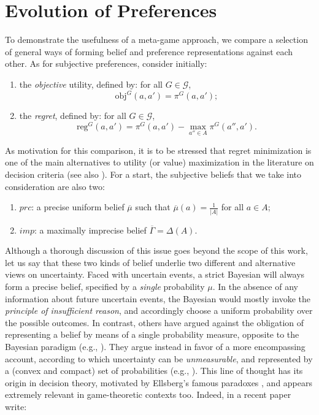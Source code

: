 \documentclass[fleqn,reqno,12pt]{article}
\theoremstyle{Satz}
\theoremstyle{Bsp}
\begin{document}
\section{Evolution of Preferences} \label{sec:model}

To demonstrate the usefulness of a meta-game approach, we compare a
selection of general ways of forming belief and preference representations against each
other. As for subjective preferences, consider initially:
\begin{enumerate}
\item the \textit{objective} utility, defined by: for all $G \in \mathcal{G}$,
$$\text{obj}^G(a,a')=\pi^G(a,a');$$
\item the \textit{regret}, defined by: for all $G \in \mathcal{G}$,
$$\text{reg}^G(a,a') =\pi^G(a,a')- \max_{a''\in A} \pi^G(a'',a').$$
\end{enumerate}

As motivation for this comparison, it is to be stressed that regret minimization is one of the main alternatives to utility (or value) maximization in the literature on decision criteria (see also \cite{bleWakker15}).
For a start, the subjective beliefs that we take into consideration are also two:
\begin{enumerate}
\item $prc$: a precise uniform belief $\overline{\mu}$ such that $\overline{\mu}(a)=\frac{1}{|A|}$ for all $a\in A$;
\item $imp$: a maximally imprecise belief $\overline{\Gamma}=\Delta(A)$.
\end{enumerate}

Although a thorough discussion of this issue goes beyond the scope of this work, let us say
that these two kinds of belief underlie two different and alternative views on
uncertainty. Faced with uncertain events, a strict Bayesian will always form a precise belief,
specified by a \textit{single} probability $\mu$. In the absence of any information about
future uncertain events, the Bayesian would mostly invoke the \textit{principle of insufficient
  reason}, and accordingly choose a uniform probability over the possible outcomes. In
contrast, others have argued against the obligation of representing a belief by means of a
single probability measure, opposite to the Bayesian paradigm (e.g., \cite{GilbMarin13}). They
argue instead in favor of a more encompassing account, according to which uncertainty can be
\emph{unmeasurable}, and represented by a (convex and compact) set of probabilities (e.g.,
\cite{gilsch89}). This line of thought has its origin in decision theory, motivated by
Ellsberg's famous paradoxes \citep{ells61}, and appears extremely relevant in game-theoretic
contexts too. Indeed, in a recent paper \citet{BattCerrMM15} write:
\end{document}

